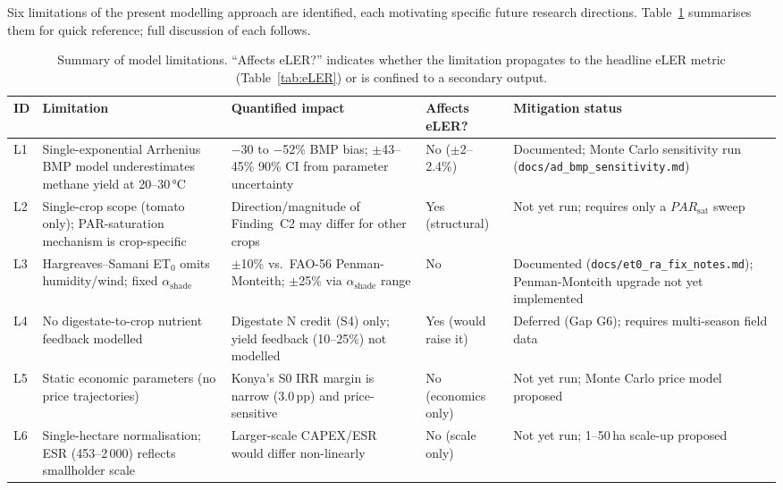\hspace{1cm}Six limitations of the present modelling approach are
identified, each motivating specific future research directions.
Table~\ref{tab:limitations} summarises them for quick reference;
full discussion of each follows.

\begin{table}[H]
	\caption{Summary of model limitations. ``Affects eLER?'' indicates
		whether the limitation propagates to the headline eLER metric
		(Table~\ref{tab:eLER}) or is confined to a secondary output.}
	\label{tab:limitations}
	\centering
	\small
	\begin{tabular}{p{1.6cm}p{4.6cm}p{2.7cm}p{2.1cm}p{2.6cm}}
		\toprule
		\textbf{ID} & \textbf{Limitation} & \textbf{Quantified impact}
		& \textbf{Affects eLER?} & \textbf{Mitigation status} \\
		\midrule
		L1 & Single-exponential Arrhenius BMP model underestimates
		methane yield at 20--30\,\si{\celsius} & $-$30 to $-$52\%
		BMP bias; $\pm$43--45\% 90\% CI from parameter uncertainty
		& No ($\pm$2--2.4\%) & Documented; Monte Carlo
		sensitivity run (\texttt{docs/ad\_bmp\_}\texttt{sensitivity.md}) \\
		L2 & Single-crop scope (tomato only); PAR-saturation
		mechanism is crop-specific & Direction/magnitude of
		Finding~C2 may differ for other crops & Yes (structural) &
		Not yet run; requires only a $PAR_{\text{sat}}$ sweep \\
		L3 & Hargreaves--Samani ET$_0$ omits humidity/wind; fixed
		$\alpha_{\text{shade}}$ & $\pm$10\% vs.\ FAO-56
		Penman-Monteith; $\pm$25\% via $\alpha_{\text{shade}}$ range
		& No & Documented (\texttt{docs/et0\_ra\_}\texttt{fix\_notes.md});
		Penman-Monteith upgrade not yet implemented \\
		L4 & No digestate-to-crop nutrient feedback modelled & Digestate
		N credit (S4) only; yield feedback (10--25\%) not modelled &
		Yes (would raise it) & Deferred (Gap G6); requires
		multi-season field data \\
		L5 & Static economic parameters (no price trajectories) &
		Konya's S0 IRR margin is narrow (3.0\,pp) and price-sensitive
		& No (economics only) & Not yet run; Monte Carlo price
		model proposed \\
		L6 & Single-hectare normalisation; ESR (453--2\,000) reflects
		smallholder scale & Larger-scale CAPEX/ESR would differ
		non-linearly & No (scale only) & Not yet run; 1--50\,ha
		scale-up proposed \\
		\bottomrule
	\end{tabular}
\end{table}



